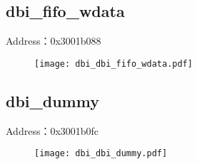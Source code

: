 \subsection{dbi\_fifo\_wdata}
\label{dbi-dbi-fifo-wdata}
Address：0x3001b088
 \begin{figure}[H]
\texttt{[image: dbi\_dbi\_fifo\_wdata.pdf]}
\end{figure}

\subsection{dbi\_dummy}
\label{dbi-dbi-dummy}
Address：0x3001b0fc
 \begin{figure}[H]
\texttt{[image: dbi\_dbi\_dummy.pdf]}
\end{figure}


